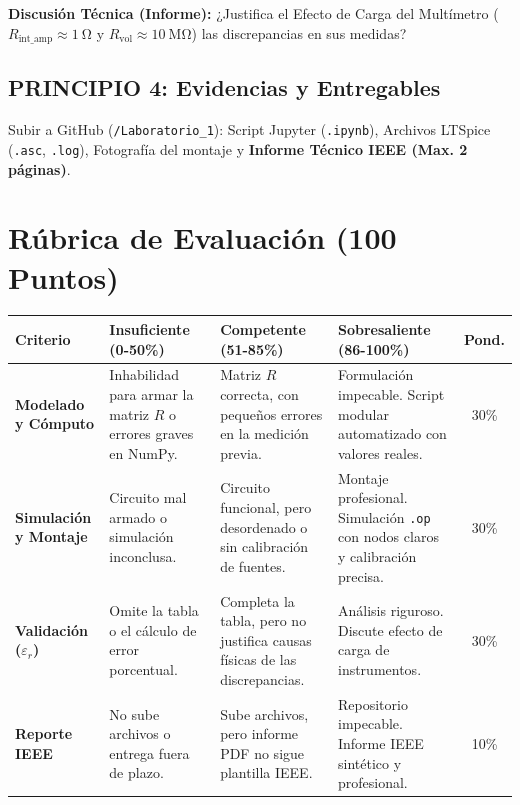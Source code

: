 \documentclass[11pt,a4paper]{article}
\begin{document}
\textbf{Discusión Técnica (Informe):} ¿Justifica el Efecto de Carga del Multímetro ($R_{\text{int\_amp}} \approx \qty{1}{\ohm}$ y $R_{\text{vol}} \approx \qty{10}{\mega\ohm}$) las discrepancias en sus medidas?

\subsection*{PRINCIPIO 4: Evidencias y Entregables}
Subir a GitHub (\texttt{/Laboratorio\_1}): Script Jupyter (\texttt{.ipynb}), Archivos LTSpice (\texttt{.asc}, \texttt{.log}), Fotografía del montaje y \textbf{Informe Técnico IEEE (Max. 2 páginas)}.

\section{Rúbrica de Evaluación (100 Puntos)}
\begin{table}[h!]
    \centering
    \footnotesize
    \begin{tabularx}{\textwidth}{@{}p{2.5cm}XXXc@{}}
        \toprule
        \textbf{Criterio} & \textbf{Insuficiente (0-50\%)} & \textbf{Competente (51-85\%)} & \textbf{Sobresaliente (86-100\%)} & \textbf{Pond.} \\
        \midrule
        \textbf{Modelado y Cómputo} & Inhabilidad para armar la matriz $R$ o errores graves en NumPy. & Matriz $R$ correcta, con pequeños errores en la medición previa. & Formulación impecable. Script modular automatizado con valores reales. & 30\% \\
        \textbf{Simulación y Montaje} & Circuito mal armado o simulación inconclusa. & Circuito funcional, pero desordenado o sin calibración de fuentes. & Montaje profesional. Simulación \texttt{.op} con nodos claros y calibración precisa. & 30\% \\
        \textbf{Validación ($\varepsilon_r$)} & Omite la tabla o el cálculo de error porcentual. & Completa la tabla, pero no justifica causas físicas de las discrepancias. & Análisis riguroso. Discute efecto de carga de instrumentos. & 30\% \\
        \textbf{Reporte IEEE} & No sube archivos o entrega fuera de plazo. & Sube archivos, pero informe PDF no sigue plantilla IEEE. & Repositorio impecable. Informe IEEE sintético y profesional. & 10\% \\
        \bottomrule
    \end{tabularx}
\end{table}
\end{document}
